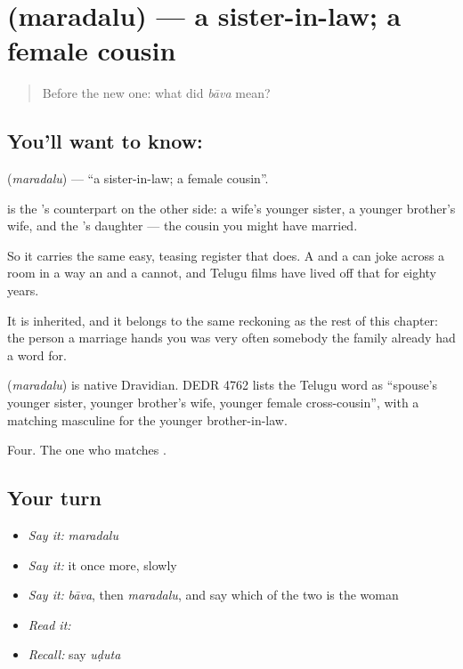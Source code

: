 \section[\texorpdfstring{\te{మరదలు} (maradalu)}{మరదలు (maradalu)}]{ (maradalu) — a sister-in-law; a female cousin}

\label{lesson:TE-C71-sister-in-law}



\begin{quote}
Before the new one: what did \emph{bāva} mean?
\end{quote}

\subsection*{You'll want to know: }
\textbf{} (\emph{maradalu}) — \textquotedblleft{}a sister-in-law; a female cousin\textquotedblright{}.

 is the 's counterpart on the other side: a wife's younger sister, a younger brother's wife, and the 's daughter — the cousin you might have married.

So it carries the same easy, teasing register that  does. A  and a  can joke across a room in a way an  and a  cannot, and Telugu films have lived off that for eighty years.

It is inherited, and it belongs to the same reckoning as the rest of this chapter: the person a marriage hands you was very often somebody the family already had a word for.

\begin{cousinweb}
\textbf{} (\emph{maradalu}) is native Dravidian. DEDR 4762 lists the Telugu word as \textquotedblleft{}spouse's younger sister, younger brother's wife, younger female cross-cousin\textquotedblright{}, with a matching masculine for the younger brother-in-law.
\end{cousinweb}

\begin{grammarlens}[title={What you've built}]
Four. The one who matches .
\end{grammarlens}

\subsection*{Your turn}
\begin{itemize}
\raggedright
  \item \emph{Say it:} \emph{maradalu}
  \item \emph{Say it:} it once more, slowly
  \item \emph{Say it:} \emph{bāva}, then \emph{maradalu}, and say which of the two is the woman
  \item \emph{Read it:} \textbf{}
  \item \emph{Recall:} say \emph{uḍuta}
\end{itemize}

